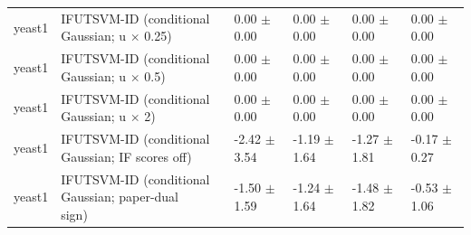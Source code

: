 \begin{table}[!t]
{\begin{tabular}{llllll}
yeast1 & \shortstack[l]{IFUTSVM-ID (conditional\\Gaussian; u \(\times\) 0.25)} & 0.00 \(\pm\) 0.00 & 0.00 \(\pm\) 0.00 & 0.00 \(\pm\) 0.00 & 0.00 \(\pm\) 0.00 \\
yeast1 & \shortstack[l]{IFUTSVM-ID (conditional\\Gaussian; u \(\times\) 0.5)} & 0.00 \(\pm\) 0.00 & 0.00 \(\pm\) 0.00 & 0.00 \(\pm\) 0.00 & 0.00 \(\pm\) 0.00 \\
yeast1 & \shortstack[l]{IFUTSVM-ID (conditional\\Gaussian; u \(\times\) 2)} & 0.00 \(\pm\) 0.00 & 0.00 \(\pm\) 0.00 & 0.00 \(\pm\) 0.00 & 0.00 \(\pm\) 0.00 \\
yeast1 & \shortstack[l]{IFUTSVM-ID (conditional\\Gaussian; IF scores off)} & -2.42 \(\pm\) 3.54 & -1.19 \(\pm\) 1.64 & -1.27 \(\pm\) 1.81 & -0.17 \(\pm\) 0.27 \\
yeast1 & \shortstack[l]{IFUTSVM-ID (conditional\\Gaussian; paper-dual\\sign)} & -1.50 \(\pm\) 1.59 & -1.24 \(\pm\) 1.64 & -1.48 \(\pm\) 1.82 & -0.53 \(\pm\) 1.06 \\
\hline
\end{tabular}%
}
\end{table}

